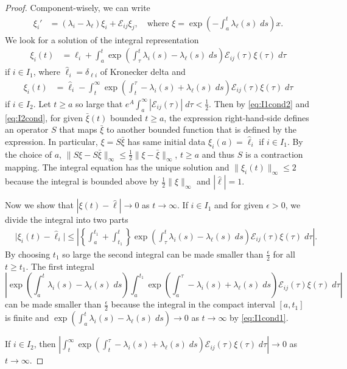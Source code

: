 \documentclass[a4paper,11pt]{article}
\theoremstyle{remark}
\begin{document}
\begin{proof}
Component-wisely, we can write
\begin{align*}
 \xi_i' & = (\lambda_i-\lambda_\ell)\xi_i + \mathcal{E}_{ij}\xi_j, \quad \text{where $\xi = \exp\left(-\int_a^t \lambda_\ell(s) \; ds\right)x$.}
\end{align*}
We look for a solution of the integral representation
\begin{align*}
 \xi_i(t) &= \hat\ell_i + \int_a^t \exp\left(\int_\tau^t \lambda_i(s)-\lambda_\ell(s) \; ds\right)\mathcal{E}_{ij}(\tau)\xi(\tau) \; d\tau
\end{align*}
if $i\in I_1$, where $\hat{\ell}_i = \delta_{\ell i}$ of Kronecker delta and
\begin{align*}
 \xi_i(t) &= \hat\ell_i -\int_t^\infty \exp\left(\int_t^\tau -\lambda_i(s)+\lambda_\ell(s) \; ds\right)\mathcal{E}_{ij}(\tau)\xi(\tau) \; d\tau
\end{align*}
if $i\in I_2$. Let $t\ge a$ so large that $e^A\int_a^\infty |\mathcal{E}_{ij}(\tau)|\; d\tau < \frac{1}{2}$. Then by \eqref{eq:I1cond2} and \eqref{eq:I2cond}, for given $\bar\xi(t)$ bounded $t\ge a$, the expression right-hand-side defines an operator $S$ that maps $\bar\xi$ to another bounded function that is defined by the expression. In particular, $\xi=S\bar\xi$ has same initial data $\xi_i(a) = \hat{\ell}_i$ if $i\in I_1$.
By the choice of $a$, $\|S\xi - S\bar\xi\|_\infty \le \frac{1}{2}\|\xi-\bar\xi\|_\infty$, $t\ge a$ and thus $S$ is a contraction mapping. The integral equation has the unique solution and $\|\xi_i(t)\|_\infty \le 2$ because the integral is bounded above by $ \frac{1}{2} \|\xi\|_\infty$ and $|\hat{\ell}|=1$.

Now we show that $|\xi(t)-\hat\ell| \rightarrow 0$ as $t \rightarrow \infty$. If $i\in I_1$ and for given $\epsilon>0$, we divide the integral into two parts
\begin{align*}
 &\big|\xi_i(t)-\hat{\ell}_i\big| \le \left|\left\{ \int_a^{t_1} + \int_{t_1}^t \right\} \exp\left(\int_\tau^t \lambda_i(s)-\lambda_\ell(s) \; ds\right)\mathcal{E}_{ij}(\tau)\xi(\tau) \; d\tau \right|.
\end{align*}
By choosing $t_1$ so large the second integral can be made smaller than $ \frac{\epsilon}{2}$ for all $t\ge t_1$. The first integral $$\left|\exp\left(\int_a^t \lambda_i(s)-\lambda_\ell(s) \; ds\right)\int_a^{t_1} \exp\left(\int_a^\tau -\lambda_i(s)+\lambda_\ell(s) \; ds\right)\mathcal{E}_{ij}(\tau)\xi(\tau) \; d\tau \right|$$
can be made smaller than $ \frac{\epsilon}{2}$ because the integral in the compact interval $[a, t_1]$ is finite and $\exp\left(\int_a^t \lambda_i(s)-\lambda_\ell(s) \; ds\right) \rightarrow 0$ as $t \rightarrow \infty$ by \eqref{eq:I1cond1}.

If $i\in I_2$, then $\left|\int_t^\infty \exp\left(\int_t^\tau -\lambda_i(s)+\lambda_\ell(s) \; ds\right)\mathcal{E}_{ij}(\tau)\xi(\tau) \; d\tau\right| \rightarrow 0$ as $t \rightarrow \infty$.




\end{proof}
\end{document}
